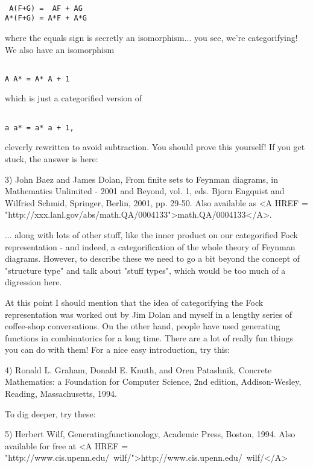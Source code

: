 \begin{verbatim}

 A(F+G) =  AF + AG
A*(F+G) = A*F + A*G
\end{verbatim}
    
where the equals sign is secretly an isomorphism... you see, we're
categorifying!  We also have an isomorphism


\begin{verbatim}

A A* = A* A + 1
\end{verbatim}
    
which is just a categorified version of 


\begin{verbatim}

a a* = a* a + 1,
\end{verbatim}
    
cleverly rewritten to avoid subtraction.   You should prove this 
yourself!  If you get stuck, the answer is here:

3) John Baez and James Dolan, From finite sets to Feynman diagrams,
in Mathematics Unlimited - 2001 and Beyond, vol. 1, eds. Bjorn
Engquist and Wilfried Schmid, Springer, Berlin, 2001, pp. 29-50. 
Also available as <A HREF = "http://xxx.lanl.gov/abs/math.QA/0004133">math.QA/0004133</A>.

... along with lots of other stuff, like the inner product on our
categorified Fock representation - and indeed, a categorification of 
the whole theory of Feynman diagrams.  However, to describe these we 
need to go a bit beyond the concept of "structure type" and
talk about
"stuff types", which would be too much of a digression here.

At this point I should mention that the idea of categorifying the Fock
representation was worked out by Jim Dolan and myself in a lengthy
series of coffee-shop conversations.   On the other hand, people have
used generating functions in combinatorics for a long time.  There
are a lot of really fun things you can do with them!  For a nice easy
introduction, try this:

4)  Ronald L. Graham, Donald E. Knuth, and Oren Patashnik,
Concrete Mathematics: a Foundation for Computer Science, 
2nd edition, Addison-Wesley, Reading, Massachusetts, 1994.

To dig deeper, try these:

5) Herbert Wilf, Generatingfunctionology, Academic Press, Boston,
1994. Also available for free at <A HREF = "http://www.cis.upenn.edu/~wilf/">http://www.cis.upenn.edu/~wilf/</A>

